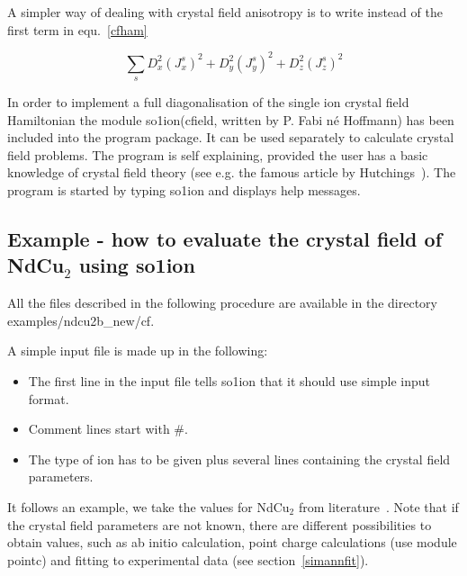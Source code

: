 A simpler way of dealing with crystal field anisotropy is to write
instead of the first term in equ.~\ref{cfham}

\begin{equation}
  \sum_s D_x^2 (J_x^s)^2 + D_y^2 (J_y^s)^2 +D_z^2 (J_z^s)^2 
\end{equation}

In order to implement a full diagonalisation of the single ion crystal field Hamiltonian
the module {\prg so1ion}({\prg cfield}, written by P. Fabi n\'e Hoffmann) has %
been included into the program package. It  can be used separately to 
calculate crystal field problems. The program is self explaining, provided 
the user has a basic knowledge of crystal field 
theory (see e.g. the famous article by Hutchings~\cite{hutchings64-227}).
The program is started by typing {\prg so1ion} and displays help messages. 

\subsection{Example - how to evaluate the crystal field of NdCu$_2$ using {\prg %
so1ion}}\label{cfieldexample}

All the files described in the following procedure are available in the directory
{\prg examples/ndcu2b\_new/cf}.

A simple input file is made up in the following:

\begin{itemize}
\item The first line in the input file tells {\prg so1ion} that it should use simple input %
format.
\item Comment lines start with \#. 
\item The type of ion has to be given plus
several lines containing the crystal field parameters. 
\end{itemize}

It follows an example, we take the values
for NdCu$_2$ from literature~\cite{gratz91-9297}. Note that
if the crystal field parameters are not known, there are different
possibilities to obtain values, such as ab initio calculation,
point charge calculations (use module {\prg pointc}) and fitting
to experimental data (see section~\ref{simannfit}).


